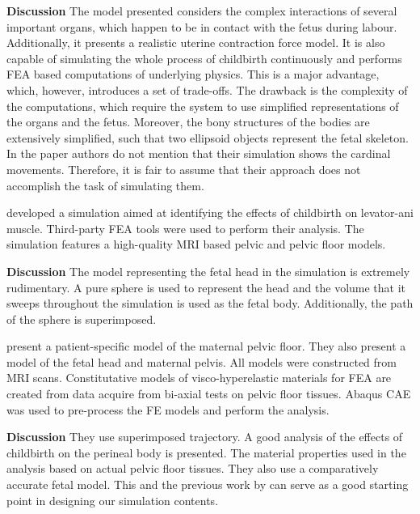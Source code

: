 \textbf{Discussion} The model presented considers the complex interactions of several important organs, which happen to be in contact with the fetus during labour. Additionally, it presents a realistic uterine contraction force model. It is also capable of simulating the whole process of childbirth continuously and performs FEA based computations of underlying physics. This is a major advantage, which, however, introduces a set of trade-offs. The drawback is the complexity of the computations, which require the system to use simplified representations of the organs and the fetus. Moreover, the bony structures of the bodies are extensively simplified, such that two ellipsoid objects represent the fetal skeleton. In the paper authors do not mention that their simulation shows the cardinal movements. Therefore, it is fair to assume that their approach does not accomplish the task of simulating them.


\textbf{\citet{Hoyte2008}} developed a simulation aimed at identifying the effects of childbirth on levator-ani muscle. Third-party FEA tools were used to perform their analysis. The simulation features a high-quality MRI based pelvic and pelvic floor models.

\textbf{Discussion } The model representing the fetal head in the simulation is extremely rudimentary. A pure sphere is used to represent the head and the volume that it sweeps throughout the simulation is used as the fetal body. Additionally, the path of the sphere is superimposed.

\textbf{\citet{DejunJing2013}} present a patient-specific model of the maternal pelvic floor. They also present a model of the fetal head and maternal pelvis. All models were constructed from MRI scans. Constitutative models of visco-hyperelastic materials for FEA are created from data acquire from bi-axial tests on pelvic floor tissues. Abaqus CAE was used to pre-process the FE models and perform the analysis.

\textbf{Discussion} They use superimposed trajectory. A good analysis of the effects of childbirth on the perineal body is presented. The material properties used in the analysis based on actual pelvic floor tissues. They also use a comparatively accurate fetal model. This and the previous work by \citet{Hoyte2008} can serve as a good starting point in designing our simulation contents.

